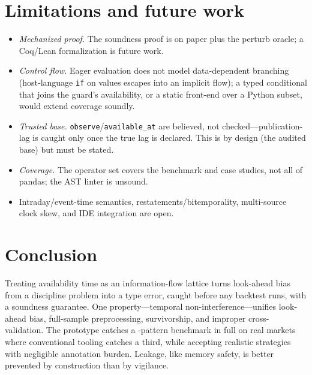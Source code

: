 \documentclass[11pt]{article}
\theoremstyle{plain}
\theoremstyle{definition}
\begin{document}
\section{Limitations and future work}\label{sec:limitations}

\begin{itemize}\itemsep1pt
  \item \emph{Mechanized proof.} The soundness proof is on paper plus the perturb
    oracle; a Coq/Lean formalization is future work.
  \item \emph{Control flow.} Eager evaluation does not model data-dependent
    branching (host-language \texttt{if} on values escapes into an implicit
    flow); a typed conditional that joins the guard's availability, or a static
    front-end over a Python subset, would extend coverage soundly.
  \item \emph{Trusted base.} \texttt{observe}/\texttt{available\_at} are believed,
    not checked---publication-lag is caught only once the true lag is declared.
    This is by design (the audited base) but must be stated.
  \item \emph{Coverage.} The operator set covers the benchmark and case studies,
    not all of pandas; the AST linter is unsound.
  \item Intraday/event-time semantics, restatements/bitemporality, multi-source
    clock skew, and IDE integration are open.
\end{itemize}

\section{Conclusion}\label{sec:conclusion}

Treating availability time as an information-flow lattice turns look-ahead bias
from a discipline problem into a type error, caught before any backtest runs, with
a soundness guarantee. One property---temporal non-interference---unifies
look-ahead bias, full-sample preprocessing, survivorship, and improper
cross-validation. The prototype catches a \benchN-pattern benchmark in full on
real markets where conventional tooling catches a third, while accepting realistic
strategies with negligible annotation burden. Leakage, like memory safety, is
better prevented by construction than by vigilance.



\end{document}
